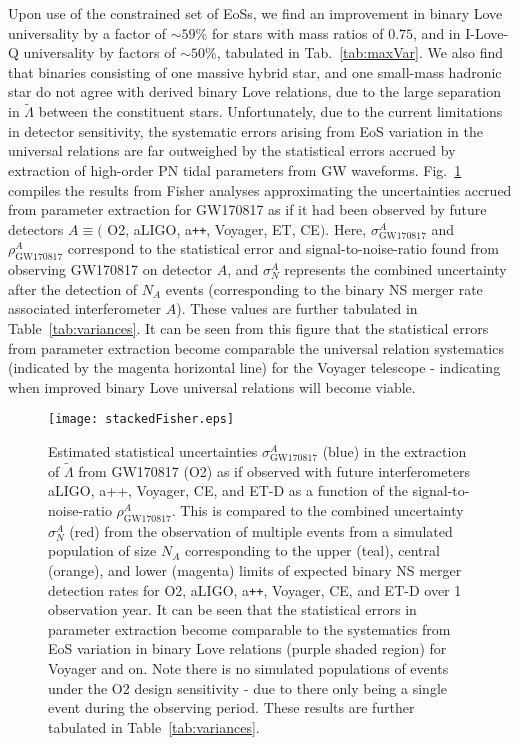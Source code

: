 \documentclass[prd,twocolumn,nofootinbib,superscriptaddress,amsmath,amssymb]{revtex4-1}
\begin{document}
Upon use of the constrained set of EoSs, we find an improvement in binary Love universality by a factor of $\sim 59$\% for stars with mass ratios of $0.75$, and in I-Love-Q universality by factors of $\sim50$\%, tabulated in Tab.~\ref{tab:maxVar}.
We also find that binaries consisting of one massive hybrid star, and one small-mass hadronic star do not agree with derived binary Love relations, due to the large separation in $\tilde{\Lambda}$ between the constituent stars.
Unfortunately, due to the current limitations in detector sensitivity, the systematic errors arising from EoS variation in the universal relations are far outweighed by the statistical errors accrued by extraction of high-order PN tidal parameters from GW waveforms.
Fig.~\ref{fig:stackedFisher} compiles the results from Fisher analyses approximating the uncertainties accrued from parameter extraction for GW170817 as if it had been observed by future detectors $A \equiv ($ O2, aLIGO, a\texttt{++}, Voyager, ET, CE$)$.
Here, $\sigma^A_{\text{GW170817}}$ and $\rho^A_{\text{GW170817}}$ correspond to the statistical error and signal-to-noise-ratio found from observing GW170817 on detector $A$, and $\sigma^A_N$ represents the combined uncertainty after the detection of $N_A$ events (corresponding to the binary NS merger rate associated interferometer $A$).
These values are further tabulated in Table~\ref{tab:variances}.
It can be seen from this figure that the statistical errors from parameter extraction become comparable the universal relation systematics (indicated by the magenta horizontal line) for the Voyager telescope - indicating when improved binary Love universal relations will become viable.
\begin{figure}
\begin{center} 
\texttt{[image: stackedFisher.eps]}
\end{center}
\caption{
Estimated statistical uncertainties $\sigma^A_{\text{GW170817}}$ (blue) in the extraction of $\tilde{\Lambda}$ from GW170817 (O2) as if observed with future interferometers aLIGO, a++, Voyager, CE, and ET-D as a function of the signal-to-noise-ratio $\rho^A_{\text{GW170817}}$.
This is compared to the combined uncertainty $\sigma^A_N$ (red) from the observation of multiple events from a simulated population of size $N_A$ corresponding to the upper (teal), central (orange), and lower (magenta) limits of expected binary NS merger detection rates for O2, aLIGO, a\texttt{++}, Voyager, CE, and ET-D over 1 observation year.
It can be seen that the statistical errors in parameter extraction become comparable to the systematics from EoS variation in binary Love relations (purple shaded region) for Voyager and on.
Note there is no simulated populations of events under the O2 design sensitivity - due to there only being a single event during the observing period.
These results are further tabulated in Table~\ref{tab:variances}.
}
\label{fig:stackedFisher}
\end{figure} 
\end{document}
